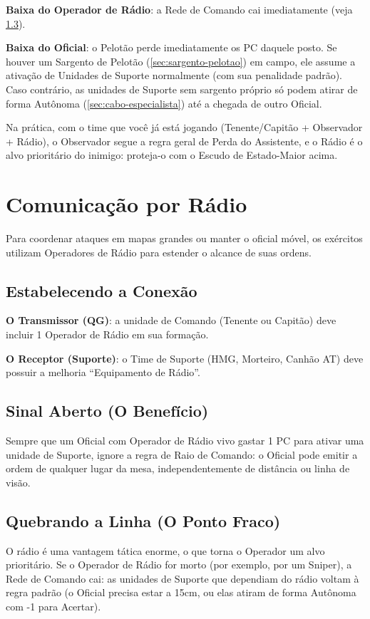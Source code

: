 \textbf{Baixa do Operador de Rádio}: a Rede de Comando cai imediatamente (veja \ref{sec:quebrando-linha}).

\textbf{Baixa do Oficial}: o Pelotão perde imediatamente os PC daquele posto. Se houver um Sargento de Pelotão (\ref{sec:sargento-pelotao}) em campo, ele assume a ativação de Unidades de Suporte normalmente (com sua penalidade padrão). Caso contrário, as unidades de Suporte sem sargento próprio só podem atirar de forma Autônoma (\ref{sec:cabo-especialista}) até a chegada de outro Oficial.

\begin{nota}
Na prática, com o time que você já está jogando (Tenente/Capitão + Observador + Rádio), o Observador segue a regra geral de Perda do Assistente, e o Rádio é o alvo prioritário do inimigo: proteja-o com o Escudo de Estado-Maior acima.
\end{nota}

\section{Comunicação por Rádio}

Para coordenar ataques em mapas grandes ou manter o oficial móvel, os exércitos utilizam Operadores de Rádio para estender o alcance de suas ordens.

\subsection{Estabelecendo a Conexão}

\textbf{O Transmissor (QG)}: a unidade de Comando (Tenente ou Capitão) deve incluir 1 Operador de Rádio em sua formação.

\textbf{O Receptor (Suporte)}: o Time de Suporte (HMG, Morteiro, Canhão AT) deve possuir a melhoria ``Equipamento de Rádio''.

\subsection{Sinal Aberto (O Benefício)}

Sempre que um Oficial com Operador de Rádio vivo gastar 1 PC para ativar uma unidade de Suporte, ignore a regra de Raio de Comando: o Oficial pode emitir a ordem de qualquer lugar da mesa, independentemente de distância ou linha de visão.

\subsection{Quebrando a Linha (O Ponto Fraco)}
\label{sec:quebrando-linha}

O rádio é uma vantagem tática enorme, o que torna o Operador um alvo prioritário. Se o Operador de Rádio for morto (por exemplo, por um Sniper), a Rede de Comando cai: as unidades de Suporte que dependiam do rádio voltam à regra padrão (o Oficial precisa estar a 15cm, ou elas atiram de forma Autônoma com -1 para Acertar).

